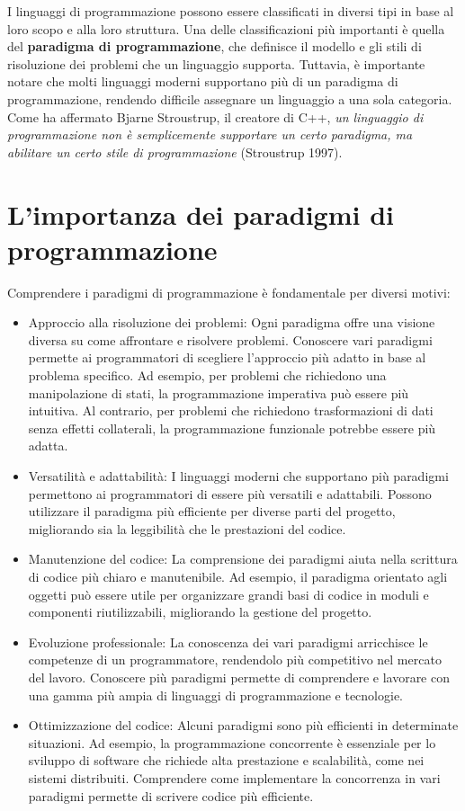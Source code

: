 \documentclass[
  letterpaper,
  DIV=11,
  numbers=noendperiod]{scrreprt}
\providecommand{\tightlist}{%
  \setlength{\itemsep}{0pt}\setlength{\parskip}{0pt}}\usepackage{longtable,booktabs,array}
\begin{document}
I linguaggi di programmazione possono essere classificati in diversi
tipi in base al loro scopo e alla loro struttura. Una delle
classificazioni più importanti è quella del \textbf{paradigma di
programmazione}, che definisce il modello e gli stili di risoluzione dei
problemi che un linguaggio supporta. Tuttavia, è importante notare che
molti linguaggi moderni supportano più di un paradigma di
programmazione, rendendo difficile assegnare un linguaggio a una sola
categoria. Come ha affermato Bjarne Stroustrup, il creatore di C++,
\emph{un linguaggio di programmazione non è semplicemente supportare un
certo paradigma, ma abilitare un certo stile di programmazione}
(Stroustrup 1997).

\section{L'importanza dei paradigmi di
programmazione}\label{limportanza-dei-paradigmi-di-programmazione}

Comprendere i paradigmi di programmazione è fondamentale per diversi
motivi:

\begin{itemize}
\tightlist
\item
  Approccio alla risoluzione dei problemi: Ogni paradigma offre una
  visione diversa su come affrontare e risolvere problemi. Conoscere
  vari paradigmi permette ai programmatori di scegliere l'approccio più
  adatto in base al problema specifico. Ad esempio, per problemi che
  richiedono una manipolazione di stati, la programmazione imperativa
  può essere più intuitiva. Al contrario, per problemi che richiedono
  trasformazioni di dati senza effetti collaterali, la programmazione
  funzionale potrebbe essere più adatta.
\item
  Versatilità e adattabilità: I linguaggi moderni che supportano più
  paradigmi permettono ai programmatori di essere più versatili e
  adattabili. Possono utilizzare il paradigma più efficiente per diverse
  parti del progetto, migliorando sia la leggibilità che le prestazioni
  del codice.
\item
  Manutenzione del codice: La comprensione dei paradigmi aiuta nella
  scrittura di codice più chiaro e manutenibile. Ad esempio, il
  paradigma orientato agli oggetti può essere utile per organizzare
  grandi basi di codice in moduli e componenti riutilizzabili,
  migliorando la gestione del progetto.
\item
  Evoluzione professionale: La conoscenza dei vari paradigmi arricchisce
  le competenze di un programmatore, rendendolo più competitivo nel
  mercato del lavoro. Conoscere più paradigmi permette di comprendere e
  lavorare con una gamma più ampia di linguaggi di programmazione e
  tecnologie.
\item
  Ottimizzazione del codice: Alcuni paradigmi sono più efficienti in
  determinate situazioni. Ad esempio, la programmazione concorrente è
  essenziale per lo sviluppo di software che richiede alta prestazione e
  scalabilità, come nei sistemi distribuiti. Comprendere come
  implementare la concorrenza in vari paradigmi permette di scrivere
  codice più efficiente.
\end{itemize}
\end{document}
